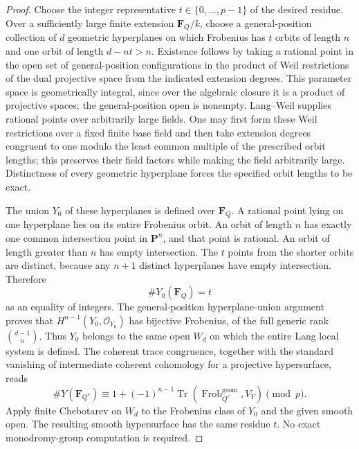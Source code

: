 \begin{proof}
Choose the integer representative $t\in\{0,\ldots,p-1\}$ of the
desired residue.  Over a sufficiently large finite extension
$\mathbf F_Q/k$, choose a general-position collection of $d$
geometric hyperplanes on which Frobenius has $t$ orbits of length $n$
and one orbit of length $d-nt>n$.  Existence follows by taking a
rational point in the open set of general-position configurations
in the product of Weil restrictions of the dual projective space
from the indicated extension degrees.  This parameter space is
geometrically integral, since over the algebraic closure it is a
product of projective spaces; the general-position open is nonempty.
Lang--Weil supplies rational points over arbitrarily large fields.
One may first form these Weil restrictions over a fixed finite base
field and then take extension degrees congruent to one modulo the
least common multiple of the prescribed orbit lengths; this preserves
their field factors while making the field arbitrarily large.
Distinctness of every geometric hyperplane forces the specified
orbit lengths to be exact.

The union $Y_0$ of these hyperplanes is defined over $\mathbf F_Q$.
A rational point lying on one hyperplane lies on its entire Frobenius
orbit.  An orbit of length $n$ has exactly one common intersection
point in $\mathbf P^n$, and that point is rational.  An orbit of
length greater than $n$ has empty intersection.  The $t$ points from
the shorter orbits are distinct, because any $n+1$ distinct
hyperplanes have empty intersection.  Therefore
\[
 \#Y_0(\mathbf F_Q)=t
\]
as an equality of integers.
The general-position hyperplane-union argument proves that
$H^{n-1}(Y_0,\mathcal O_{Y_0})$ has bijective Frobenius, of the full
generic rank $\binom{d-1}{n}$.  Thus $Y_0$ belongs to the same open
$W_d$ on which the entire Lang local system is defined.
The coherent trace congruence, together with the standard vanishing
of intermediate coherent cohomology for a projective hypersurface,
reads
\[
 \#Y(\mathbf F_{Q^e})\equiv
 1+(-1)^{n-1}\operatorname{Tr}(\operatorname{Frob}_{Q^e}^{\mathrm{geom}},V_Y)
 \pmod p.
\]
Apply finite Chebotarev on $W_d$ to the Frobenius class of $Y_0$ and
the given smooth open.  The resulting smooth hypersurface has the
same residue $t$.  No exact monodromy-group computation is required.
\end{proof}

